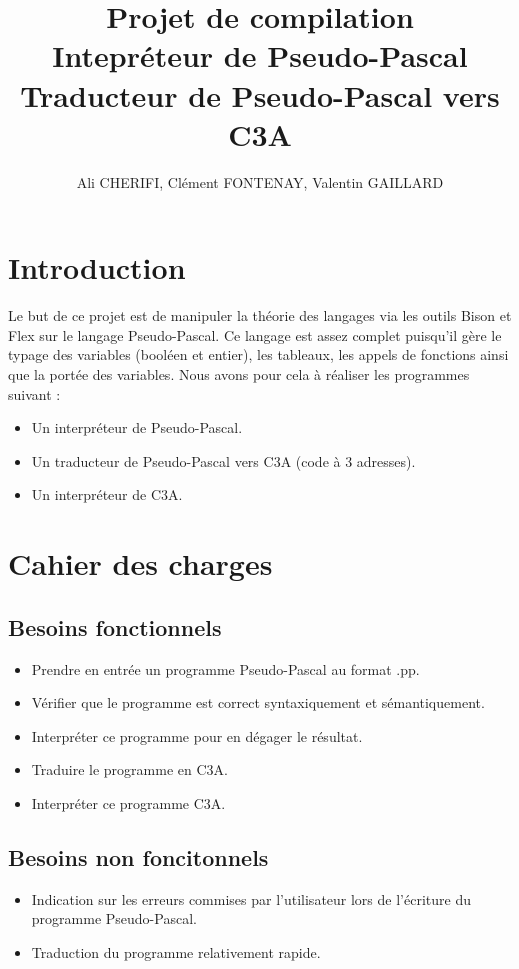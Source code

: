 \documentclass[10pt,a4paper]{article}
\author{Ali CHERIFI, Clément FONTENAY, Valentin GAILLARD}
\title{Projet de compilation\\Intepréteur de Pseudo-Pascal \\Traducteur de Pseudo-Pascal vers C3A}
\begin{document}
\maketitle
\newpage
\tableofcontents
\newpage
\section{Introduction}

Le but de ce projet est de manipuler la théorie des langages via les outils Bison et Flex sur le langage Pseudo-Pascal.
Ce langage est assez complet puisqu'il gère le typage des variables (booléen et entier), les tableaux, les appels de fonctions ainsi que la portée des variables.
Nous avons pour cela à réaliser les programmes suivant :\\ 
\begin{itemize}
    \item Un interpréteur de Pseudo-Pascal.
    \item Un traducteur de Pseudo-Pascal vers C3A (code à 3 adresses).
    \item Un interpréteur de C3A.
\end{itemize}

\section{Cahier des charges}
\subsection{Besoins fonctionnels}

\begin{itemize}
    \item Prendre en entrée un programme Pseudo-Pascal au format .pp.
    \item Vérifier que le programme est correct syntaxiquement et sémantiquement.
    \item Interpréter ce programme pour en dégager le résultat.
    \item Traduire le programme en C3A.
    \item Interpréter ce programme C3A.
\end{itemize}

\subsection{Besoins non foncitonnels}

\begin{itemize}
    \item Indication sur les erreurs commises par l'utilisateur lors de l'écriture du programme Pseudo-Pascal.
    \item Traduction du programme relativement rapide.\\
\end{itemize}
\end{document}
